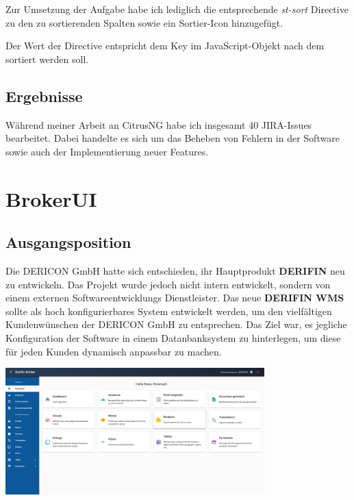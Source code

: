 \documentclass[chapterprefix=false, 12pt, a4paper, oneside, parskip=half, listof=totoc, bibliography=totoc, numbers=noendperiod]{scrbook}
\begin{document}
    Zur Umsetzung der Aufgabe habe ich lediglich die entsprechende \textit{st-sort} Directive zu den zu sortierenden
    Spalten sowie ein Sortier-Icon hinzugefügt.

    \pagebreak

    Der Wert der Directive entspricht dem Key im JavaScript-Objekt nach dem
    sortiert werden soll.

    \subsection{Ergebnisse}

    Während meiner Arbeit an CitrusNG habe ich insgesamt 40 JIRA-Issues bearbeitet. Dabei handelte
    es sich um das Beheben von Fehlern in der Software sowie auch der Implementierung neuer Features.

    \section{BrokerUI}

    \subsection{Ausgangsposition}

    Die DERICON GmbH hatte sich entschieden, ihr Hauptprodukt \textbf{DERIFIN} neu zu entwickeln.
    Das Projekt wurde jedoch nicht intern entwickelt, sondern von einem externen Softwareentwicklungs Dienstleister.
    Das neue \textbf{DERIFIN WMS} sollte als hoch konfigurierbares System entwickelt werden, um den vielfältigen
    Kundenwünschen der DERICON GmbH zu entsprechen. Das Ziel war, es jegliche Konfiguration der Software in einem
    Datanbanksystem zu hinterlegen, um diese für jeden Kunden dynamisch anpassbar zu machen.

    \begin{center}
        \includegraphics[width=0.75\textwidth]{img/broker-ui-neu.png}
    \end{center}
\end{document}
